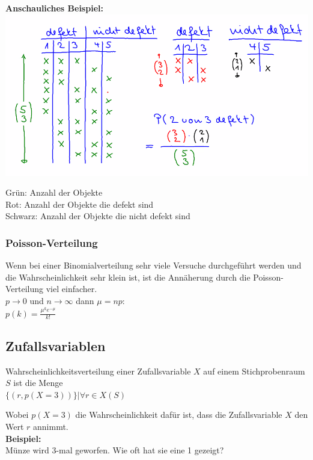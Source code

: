 \documentclass[12pt]{scrartcl}
\begin{document}
\textbf{Anschauliches Beispiel:}\\
\includegraphics[width=15cm]{img/hypergeometrische Verteilung.png}

Grün: Anzahl der Objekte\\
Rot: Anzahl der Objekte die defekt sind\\
Schwarz: Anzahl der Objekte die nicht defekt sind\\


\subsubsection{Poisson-Verteilung}
Wenn bei einer Binomialverteilung sehr viele Versuche durchgeführt werden und die Wahrscheinlichkeit 
sehr klein ist, ist die Annäherung durch die Poisson-Verteilung viel einfacher.\\
$p \rightarrow 0$ und $n \rightarrow \infty$ dann $\mu = np$:\\

$\displaystyle{p(k) = \frac{\mu^k e^{-\mu}}{k!}}$\\


\subsection{Zufallsvariablen}
Wahrscheinlichkeitsverteilung einer Zufallsvariable $X$ auf einem Stichprobenraum
$S$ ist die Menge\\

$\{(r,p(X=3))\} | \forall r \in X(S)$

Wobei $p(X=3)$ die Wahrscheinlichkeit dafür ist, dass die Zufallsvariable $X$ den Wert $r$
annimmt.\\

\textbf{Beispiel:}\\
Münze wird 3-mal geworfen. Wie oft hat sie eine 1 gezeigt?\\
\end{document}

